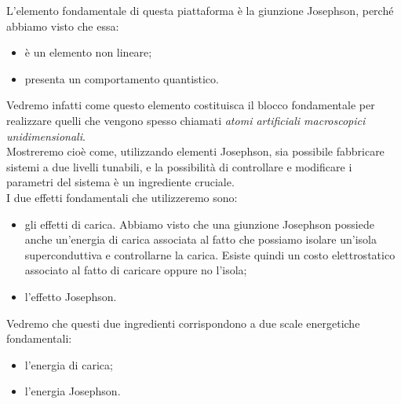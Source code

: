 L'elemento fondamentale di questa piattaforma è la giunzione Josephson, perché abbiamo visto che essa:
\begin{itemize}[leftmargin=0.5cm]
    \item è un elemento non lineare;
    \item presenta un comportamento quantistico.
\end{itemize}
Vedremo infatti come questo elemento costituisca il blocco fondamentale per realizzare quelli che vengono spesso chiamati \emph{atomi artificiali macroscopici unidimensionali}.\\
Mostreremo cioè come, utilizzando elementi Josephson, sia possibile fabbricare sistemi a due livelli tunabili, e la possibilità di controllare e modificare i parametri del sistema è un ingrediente cruciale.\\
I due effetti fondamentali che utilizzeremo sono:
\begin{itemize}[leftmargin=0.5cm]
    \item gli effetti di carica. Abbiamo visto che una giunzione Josephson possiede anche un'energia di carica associata al fatto che possiamo isolare un'isola superconduttiva e controllarne la carica. Esiste quindi un costo elettrostatico associato al fatto di caricare oppure no l'isola;
    \item l'effetto Josephson.
\end{itemize}
Vedremo che questi due ingredienti corrispondono a due scale energetiche fondamentali:
\begin{itemize}[leftmargin=0.5cm]
    \item l'energia di carica;
    \item l'energia Josephson.
\end{itemize}
